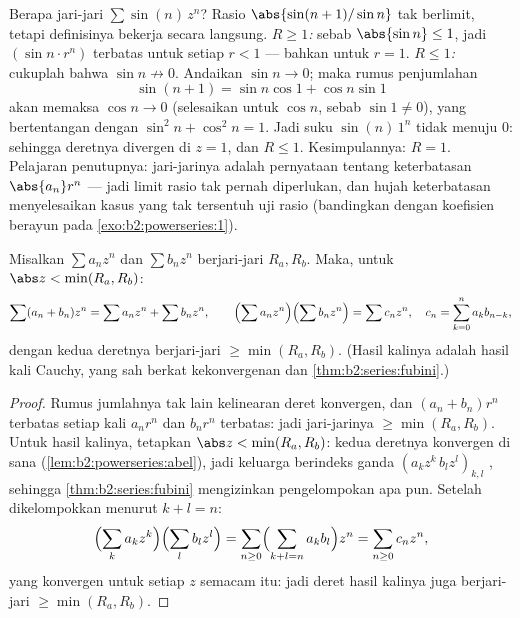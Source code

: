 \begin{example}\label{ex:b2:powerseries:sinn}
Berapa jari-jari $\sum \sin(n)\,z^n$? Rasio
$\abs{\sin(n+1)/\sin n}$ tak berlimit, tetapi definisinya bekerja
secara langsung. \emph{$R \geq 1$:} sebab $\abs{\sin n} \leq 1$, jadi
$(\sin n\cdot r^n)$ terbatas untuk setiap $r < 1$ --- bahkan untuk $r =
1$. \emph{$R \leq 1$:} cukuplah bahwa $\sin n \not\to 0$.
Andaikan $\sin n \to 0$; maka rumus penjumlahan
\[
\sin(n+1) = \sin n\cos 1 + \cos n\sin 1
\]
akan memaksa $\cos n \to 0$ (selesaikan untuk $\cos n$, sebab $\sin 1
\neq 0$), yang bertentangan dengan $\sin^2 n + \cos^2 n = 1$. Jadi suku
$\sin(n)\,1^n$ tidak menuju $0$: sehingga deretnya divergen di $z =
1$, dan $R \leq 1$. Kesimpulannya: $R = 1$. Pelajaran penutupnya:
jari-jarinya adalah pernyataan tentang keterbatasan $\abs{a_n}r^n$ ---
jadi limit rasio tak pernah diperlukan, dan hujah keterbatasan
menyelesaikan kasus yang tak tersentuh uji rasio (bandingkan dengan
koefisien berayun pada \cref{exo:b2:powerseries:1}).
\end{example}

\begin{proposition}[Operasi]\label{prop:b2:powerseries:operations}
Misalkan $\sum a_nz^n$ dan $\sum b_nz^n$ berjari-jari $R_a, R_b$. Maka,
untuk $\abs z < \min(R_a, R_b)$:
\[
\sum (a_n + b_n)z^n = \sum a_nz^n + \sum b_nz^n,
\qquad
\Bigl(\sum a_nz^n\Bigr)\Bigl(\sum b_nz^n\Bigr) = \sum c_n z^n,
\quad c_n = \sum_{k=0}^{n} a_kb_{n-k},
\]
dengan kedua deretnya berjari-jari $\geq \min(R_a, R_b)$. (Hasil kalinya
adalah hasil kali Cauchy, yang sah berkat kekonvergenan  dan
\cref{thm:b2:series:fubini}.)
\end{proposition}

\begin{proof}
Rumus jumlahnya tak lain kelinearan deret konvergen, dan
$(a_n + b_n)r^n$ terbatas setiap kali $a_nr^n$ dan $b_nr^n$
terbatas: jadi jari-jarinya $\geq \min(R_a, R_b)$. Untuk hasil kalinya,
tetapkan $\abs z < \min(R_a, R_b)$: kedua deretnya konvergen
\emph{} di sana (\cref{lem:b2:powerseries:abel}), jadi keluarga
berindeks ganda $(a_kz^k\,b_lz^l)_{k,l}$ , sehingga
\cref{thm:b2:series:fubini} mengizinkan pengelompokan apa pun. Setelah
dikelompokkan menurut $k + l = n$:
\[
\Bigl(\sum_k a_kz^k\Bigr)\Bigl(\sum_l b_lz^l\Bigr)
= \sum_{n\geq0}\Bigl(\sum_{k+l=n}a_kb_l\Bigr)z^n
= \sum_{n\geq0}c_nz^n ,
\]
yang konvergen  untuk setiap $z$ semacam itu: jadi deret hasil
kalinya juga berjari-jari $\geq \min(R_a, R_b)$.
\end{proof}

